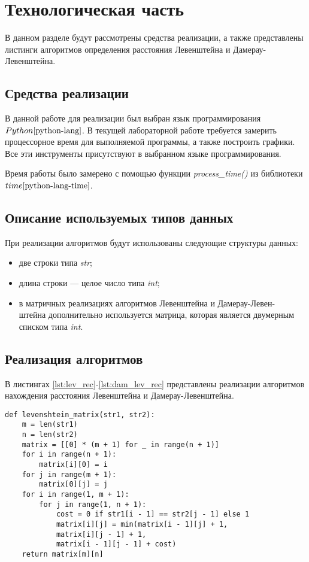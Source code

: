 \chapter{Технологическая часть}

В данном разделе будут рассмотрены средства реализации, а также представлены листинги алгоритмов определения расстояния Левенштейна и Дамерау-Левенштейна.

\section{Средства реализации}
В данной работе для реализации был выбран язык программирования $Python \cite{python-lang}$. В текущей лабораторной работе требуется замерить процессорное время для выполняемой программы, а также построить графики. Все эти инструменты присутствуют в выбранном языке программирования.

Время работы было замерено с помощью функции \textit{process\_time()} из библиотеки $time \cite{python-lang-time}$.


\section{Описание используемых типов данных}
При реализации алгоритмов будут использованы следующие структуры данных:

\begin{itemize}
	\item две строки типа \textit{str};
	\item длина строки --- целое число типа \textit{int};
	\item в матричных реализациях алгоритмов Левенштейна и Дамерау-Левен-\\штейна дополнительно используется матрица, которая является двумерным списком типа \textit{int}. 
\end{itemize}


\section{Реализация алгоритмов}

В листингах \ref{lst:lev_rec}-\ref{lst:dam_lev_rec} представлены реализации алгоритмов нахождения расстояния Левенштейна и Дамерау-Левенштейна.
\begin{center}
    \captionsetup{justification=raggedright,singlelinecheck=off}
    \begin{lstlisting}[label=lst:lev_rec,caption=Алгоритм нахождения расстояния Левенштейна (матричный)]
def levenshtein_matrix(str1, str2):
	m = len(str1)
	n = len(str2)
	matrix = [[0] * (m + 1) for _ in range(n + 1)]
	for i in range(n + 1):
		matrix[i][0] = i
	for j in range(m + 1):
		matrix[0][j] = j
	for i in range(1, m + 1):
		for j in range(1, n + 1):
			cost = 0 if str1[i - 1] == str2[j - 1] else 1
			matrix[i][j] = min(matrix[i - 1][j] + 1,         
			matrix[i][j - 1] + 1,         
			matrix[i - 1][j - 1] + cost)  
	return matrix[m][n]
\end{lstlisting}
\end{center}


